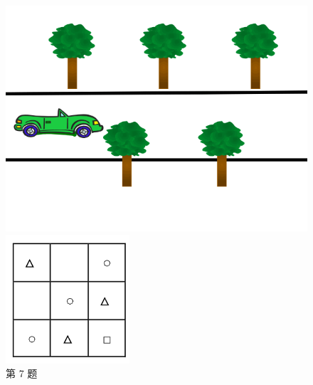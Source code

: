 \documentclass[10pt, a4paper]{article}
\begin{document}
\begin{enumerate}
        \begin{figure}[htbp]
            \centering
            \begin{minipage}[t]{.22\textwidth}
                \centering
                \includegraphics[width=\textwidth]{figure/7.png}
                \caption*{第 7 题}
            \end{minipage}
            \begin{minipage}[t]{.16\textwidth}
                \centering
                \includegraphics[width=\textwidth]{figure/8.png}

\end{minipage}
\end{figure}
\end{enumerate}
\end{document}
